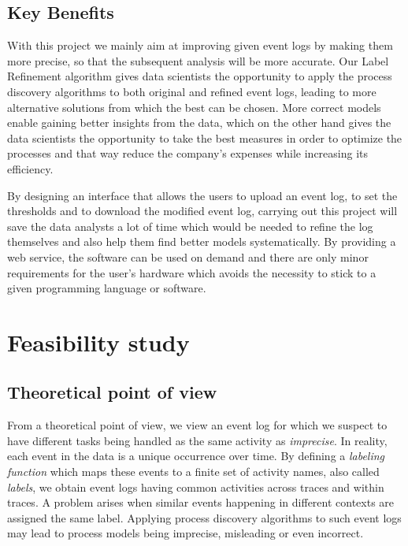 \documentclass[notitlepage]{article}
\begin{document}
\begin{flushleft}
\subsection{Key Benefits}
 
With this project we mainly aim at improving given event logs by making them more precise, so that the subsequent analysis will be more accurate. 
Our Label Refinement algorithm gives data scientists the opportunity to apply the process discovery algorithms to both original and refined event logs, leading to more alternative solutions from which the best can be chosen.
More correct models enable gaining better insights from the data, which on the other hand gives the data scientists the opportunity to take the best measures in order to optimize the processes and that way reduce the company's expenses while increasing its efficiency.  

By designing an interface that allows the users to upload an event log, to set the thresholds and to download the modified event log, carrying out this project will save the data analysts a lot of time which would be needed to refine the log themselves and also help them find better models systematically. 
By providing a web service, the software can be used on demand and there are only minor requirements for the user's hardware which avoids the necessity to stick to a given programming language or software.


\section{Feasibility study}

\subsection{Theoretical point of view}

From a theoretical point of view, we view an event log for which we suspect to have different tasks being handled as the same activity as \textit{imprecise}.
In reality, each event in the data is a unique occurrence over time.
By defining a \textit{labeling  function} which maps these events to a finite set of activity names, also called \textit{labels}, we obtain event logs having common activities across traces and within traces.
A problem arises when similar events happening in different contexts are assigned the same label.
Applying process discovery algorithms to such event logs may lead to process models being imprecise, misleading or even incorrect.


\end{flushleft}
\end{document}
